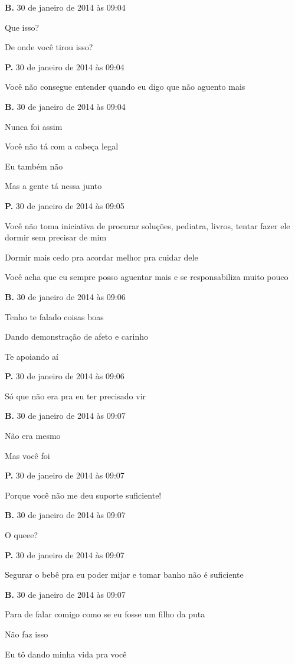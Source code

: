 {{\textbf{B.} 30 de janeiro de 2014 às 09:04

Que isso?

De onde você tirou isso?

\textbf{P.} 30 de janeiro de 2014 às 09:04

Você não consegue entender quando eu digo que não aguento mais

\textbf{B.} 30 de janeiro de 2014 às 09:04

Nunca foi assim

Você não tá com a cabeça legal

Eu também não

Mas a gente tá nessa junto

\textbf{P.} 30 de janeiro de 2014 às 09:05

Você não toma iniciativa de procurar soluções, pediatra, livros, tentar
fazer ele dormir sem precisar de mim

Dormir mais cedo pra acordar melhor pra cuidar dele

Você acha que eu sempre posso aguentar mais e se responsabiliza muito
pouco

\textbf{B.} 30 de janeiro de 2014 às 09:06

Tenho te falado coisas boas

Dando demonstração de afeto e carinho

Te apoiando aí

\textbf{P.} 30 de janeiro de 2014 às 09:06

Só que não era pra eu ter precisado vir

\textbf{B.} 30 de janeiro de 2014 às 09:07

Não era mesmo

Mas você foi

\textbf{P.} 30 de janeiro de 2014 às 09:07

Porque você não me deu suporte suficiente!

\textbf{B.} 30 de janeiro de 2014 às 09:07

O queee?

\textbf{P.} 30 de janeiro de 2014 às 09:07

Segurar o bebê pra eu poder mijar e tomar banho não é suficiente

\textbf{B.} 30 de janeiro de 2014 às 09:07

Para de falar comigo como se eu fosse um filho da puta

Não faz isso

Eu tô dando minha vida pra você

}}

